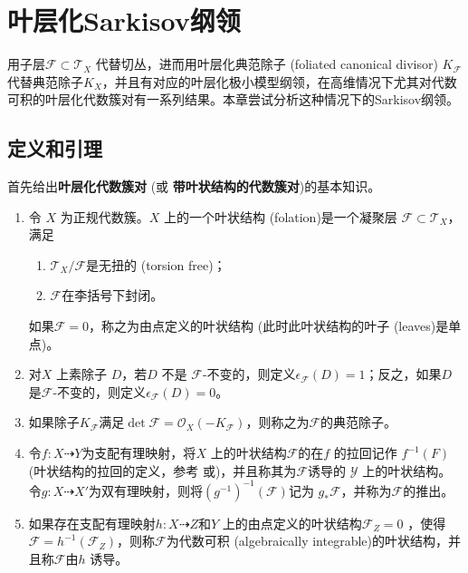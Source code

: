 \chapter{叶层化Sarkisov纲领}
用子层$\mathcal{F} \subset \mathcal{T}_{X}$ 代替切丛，进而用叶层化典范除子 (foliated canonical divisor) $K_{\mathcal{F}}$代替典范除子$K_{X}$，并且有对应的叶层化极小模型纲领，在高维情况下尤其对代数可积的叶层化代数簇对有一系列结果。本章尝试分析这种情况下的Sarkisov纲领。
\section{定义和引理}
首先给出\textbf{叶层化代数簇对} (或 \textbf{带叶状结构的代数簇对})的基本知识。

\begin{definition}[叶状结构]\cite[Definition 2.3-6]{acc_foliation}
  \begin{enumerate}
    \item 令 $X$ 为正规代数簇。$X$ 上的一个叶状结构 (folation)是一个凝聚层 $\mathcal{F} \subset \mathcal{T}_{X}$，满足
          \begin{enumerate}
            \item $\mathcal{T}_{X}/\mathcal{F}$是无扭的 (torsion free)；
            \item $\mathcal{F}$在李括号下封闭。 
          \end{enumerate}
          如果$\mathcal{F}=0$，称之为由点定义的叶状结构 (此时此叶状结构的叶子 (leaves)是单点)。
    \item 对$X$ 上素除子 $D$，若$D$ 不是 $\mathcal{F}$-不变的，则定义$\epsilon_{\mathcal{F}}(D)=1 $；反之，如果$D$ 是$\mathcal{F}$-不变的，则定义$\epsilon_{\mathcal{F}}(D)=0$。
    \item 如果除子$K_{\mathcal{F}}$满足$\det \mathcal{F} = \mathcal{O}_{X}(-K_{\mathcal{F}})$，则称之为$\mathcal{F}$的典范除子。
    \item 令$f:X \dashrightarrow Y$为支配有理映射，将$X$ 上的叶状结构$\mathcal{F}$的在$f$ 的拉回记作  $ f^{-1}(F) $ (叶状结构的拉回的定义，参考\cite[3.1]{acss} 或\cite[3.2]{cs21})，并且称其为$\mathcal{F}$诱导的 $\mathcal{Y}$ 上的叶状结构。令$g:X \dashrightarrow X' $为双有理映射，则将$(g^{-1})^{-1}(\mathcal{F})$记为 $g_{*}\mathcal{F}$，并称为$\mathcal{F}$的推出。
    \item 如果存在支配有理映射$h:X \dashrightarrow  Z$和$Y$ 上的由点定义的叶状结构$\mathcal{F}_{Z}=0$  ，使得  $\mathcal{F}=h^{-1}(\mathcal{F}_{Z})$，则称$\mathcal{F}$为代数可积 (algebraically integrable)的叶状结构，并且称$\mathcal{F}$由$h$ 诱导。 
  \end{enumerate}
\end{definition}
